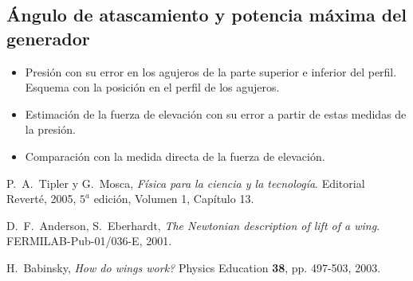 \documentclass[11pt]{articulo}
\begin{document}
\subsection*{\'Angulo de atascamiento y potencia m\'axima del generador}

\begin{itemize}

\item{Presi\'on con su error en los agujeros de la parte superior e inferior del perfil. Esquema con la posici\'on en el perfil de los agujeros.}
\item{Estimaci\'on de la fuerza de elevaci\'on con su error a partir de estas medidas de la presi\'on.}
\item{Comparaci\'on con la medida directa de la fuerza de elevaci\'on.}

\end{itemize}



\begin{thebibliography}{X}

P.~A.~Tipler y G.~Mosca,
\textit{F\'isica para la ciencia y la tecnolog\'ia}. 
Editorial Revert\'e, 2005, $5^{a}$ edici\'on, Volumen 1, Cap\'itulo 13.

D.~F.~Anderson, S.~Eberhardt,
\textit{The Newtonian description of lift of a wing}.
FERMILAB-Pub-01/036-E, 2001.

H.~Babinsky,
{\it How do wings work?}
Physics Education {\bf 38}, pp. 497-503, 2003.

\end{thebibliography}


\end{document}
